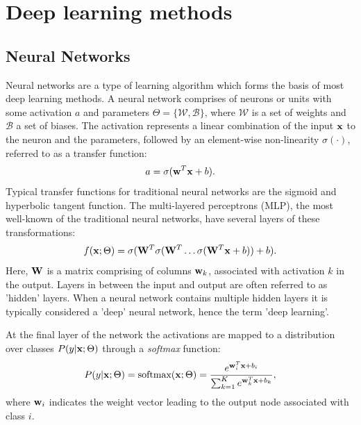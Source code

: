 \section{Deep learning methods}
\label{sec:neuralnets}

\subsection{Neural Networks}
Neural networks are a type of learning algorithm which forms the basis of most deep learning methods. A neural network comprises of neurons or units with some activation $a$ and parameters $\Theta = \{\mathcal{W}, \mathcal{B}\}$, where $\mathcal{W}$ is a set of weights and $\mathcal{B}$ a set of biases. The activation represents a linear combination of the input ${\bf x}$ to the neuron and the parameters, followed by an element-wise non-linearity $\sigma(\cdot)$, referred to as a transfer function: 
\begin{equation}
a = \sigma({\bf w}^{T}{\bf x} + b).
\end{equation}
Typical transfer functions for traditional neural networks are the sigmoid and hyperbolic tangent function.  The multi-layered perceptrons (MLP), the most well-known of the traditional neural networks, have several layers of these transformations:
\begin{equation}
f({\bf x}; \Theta) = \sigma( {\bf W}^{T}\sigma({\bf W}^{T} \ldots \sigma({\bf W}^{T} {\bf x} + b)  ) + b).
\end{equation}
Here, ${\bf W}$ is a matrix comprising of columns ${\bf w}_{k}$, associated with activation $k$ in the output. Layers in between the input and output are often referred to as 'hidden' layers. When a neural network contains multiple hidden layers it is typically considered a 'deep' neural network, hence the term 'deep learning'.

At the final layer of the network the activations are mapped to a distribution over classes $P(y | {\bf x}; \Theta)$ through a {\it softmax} function:
\begin{equation}
P(y | {\bf x}; \Theta) = \text{softmax}({\bf x}; \Theta) = \frac{e^{{\bf w}_{i}^{T}{\bf x} + b_{i}}}{\sum^{K}_{k = 1} e^{{\bf w}_{k}^{T}{\bf x} + b_{k}}},
\end{equation}
where ${\bf w}_{i}$ indicates the weight vector leading to the output node associated with class $i$. 

